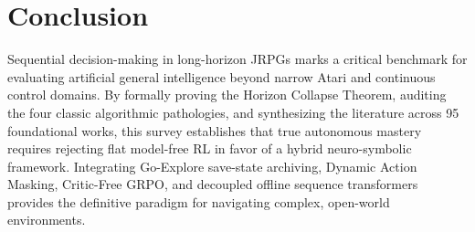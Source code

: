 \documentclass[journal,10pt,twocolumn]{IEEEtran}
\begin{document}
\section{Conclusion}
Sequential decision-making in long-horizon JRPGs marks a critical benchmark for evaluating artificial general intelligence beyond narrow Atari and continuous control domains. By formally proving the Horizon Collapse Theorem, auditing the four classic algorithmic pathologies, and synthesizing the literature across 95 foundational works, this survey establishes that true autonomous mastery requires rejecting flat model-free RL in favor of a hybrid neuro-symbolic framework. Integrating Go-Explore save-state archiving, Dynamic Action Masking, Critic-Free GRPO, and decoupled offline sequence transformers provides the definitive paradigm for navigating complex, open-world environments.


\nocite{*}

\end{document}
